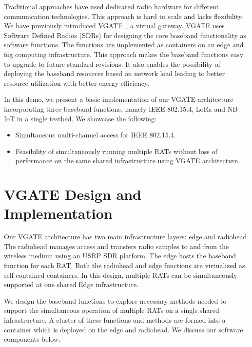 \documentclass[10pt,emptycopyrightspace]{ewsn-proc}
\begin{document}
Traditional approaches have used dedicated radio hardware for different communication technologies. This approach is hard to scale and lacks flexibility. We have previously introduced VGATE~\cite{hazra2019handling}, a virtual gateway. VGATE uses Software Defined Radios (SDRs) for designing the core baseband functionality as software functions. The functions are implemented as containers on an edge and fog computing infrastructure. This approach makes the baseband functions easy to upgrade to future standard revisions.  It also enables the possibility of deploying the baseband resources based on network load leading to better resource utilization with better energy efficiency.


In this demo, we present a basic implementation of our VGATE architecture incorporating three baseband functions, namely IEEE 802.15.4, LoRa and NB-IoT in a single testbed. We showcase the following:
\begin{itemize}
	\item Simultaneous multi-channel access for IEEE 802.15.4.
	\item Feasibility of simultaneously running multiple RATs without loss of performance on the same shared infrastructure using VGATE architecture.
\end{itemize}

\section{VGATE Design and Implementation}
\label{sec:implementation}
Our VGATE architecture
has two main infrastructure layers: edge and radiohead. The radiohead manages access and transfers radio samples to and from the wireless medium using an USRP SDR platform.  The edge hosts the baseband function for each RAT. Both the radiohead and edge functions are virtualized as self-contained containers. In this design, multiple RATs can be simultaneously supported at one shared Edge
infrastructure. %


We design the baseband functions to explore necessary methods needed to support the simultaneous operation of multiple RATs on a single shared infrastructure. A cluster of these functions and methods are formed into a container which is deployed on the edge and radiohead. We discuss our software components below. 
\end{document}
